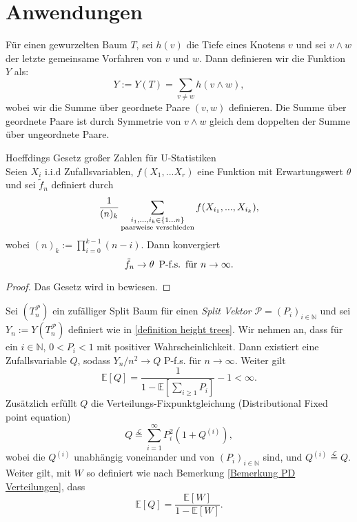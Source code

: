 \chapter{Anwendungen}
\begin{Definition}
    \label{definition height trees}
    Für einen gewurzelten Baum $T$, sei $h(v)$ die Tiefe eines Knotens $v$ und sei $v\wedge w$ der letzte gemeinsame Vorfahren von $v$ und $w$. Dann definieren wir die Funktion $Y$ als:
    \[
        Y := Y(T) = \sum_{v \neq w}h(v \wedge w),
    \]
    wobei wir die Summe über geordnete Paare $(v,w)$ definieren. Die Summe über geordnete Paare ist durch Symmetrie von $v \wedge w$ gleich dem doppelten der Summe über ungeordnete Paare. 
\end{Definition}
\begin{theorem}\textnormal{Hoeffdings Gesetz großer Zahlen für U-Statistiken}\\
    \label{hoeffding theorem}
    Seien $X_i$ i.i.d Zufallsvariablen, $f(X_1,...X_r)$ eine Funktion mit Erwartungswert $\theta$ und sei $\tilde{f}_n$ definiert durch 
    \[
        \frac{1}{(n)_{k}}\sum_{\substack{i_1,...,i_k \in \{1...n\}\\ \textnormal{paarweise verschieden}}}f(X_{i_1},...,X_{i_k}),
    \]
    wobei $(n)_k := \prod_{i=0}^{k-1}(n-i)$.
    Dann konvergiert 
    \[
        \tilde{f}_n  \rightarrow \theta \hspace{5pt} \textnormal{P-f.s.} \hspace{5pt} \textnormal{für } n \rightarrow \infty.
    \]
\begin{proof}
    Das Gesetz wird in \cite{hoeffding1961strong} bewiesen.
\end{proof}
\end{theorem}
\begin{theorem}
    \label{big Q theorem}
    Sei $(T_n^\mathcal{P})$ ein zufälliger Split Baum für einen \textit{Split Vektor} $\mathcal{P} = (P_i)_{i \in \mathbb{N}}$ und sei $Y_n := Y(T^\mathcal{P}_n)$ definiert wie in \ref{definition height trees}. Wir nehmen an, dass für ein $i \in \mathbb{N}$, $0< P_i < 1$ mit positiver Wahrscheinlichkeit. Dann existiert eine Zufallsvariable $Q$, sodass $Y_n/n^2 \rightarrow Q$ P-f.s. für $n \to \infty$. Weiter gilt 
    \begin{equation}
        \label{first equation of Q theorem}
    \mathbb{E}[Q]  = \frac{1}{1-\mathbb{E}[\sum_{i \geq 1}P_i ]}-1 < \infty. 
    \end{equation} 
    Zusätzlich erfüllt $Q$ die Verteilungs-Fixpunktgleichung (Distributional Fixed point equation)
    \begin{equation}
        Q \stackrel{\mathcal{L}}{=} \sum_{i=1}^{\infty}P_i^2(1+Q^{(i)}),
        \label{second equation of Q theorem}
    \end{equation} 
    wobei die $Q^{(i)}$ unabhängig voneinander und von $(P_i)_{i \in \mathbb{N}}$ sind, und $Q^{(i)} \stackrel{\mathcal{L}}{=}Q$. 
    Weiter gilt, mit $W$ so definiert wie nach Bemerkung \ref{Bemerkung PD Verteilungen}, dass 
\begin{equation}
    \mathbb{E}[Q] = \frac{\mathbb{E}[W]}{1 - \mathbb{E}[W]}.
        \label{third equation of Q theorem}
\end{equation}
\end{theorem}
